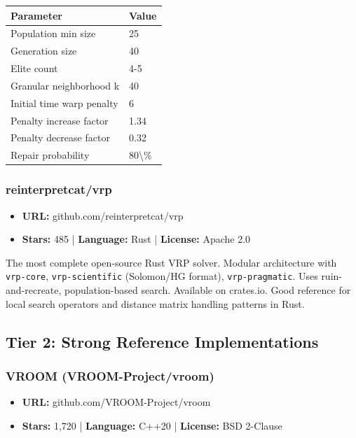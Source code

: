 \documentclass[twocolumn,10pt,letterpaper]{article}
\begin{document}
\vspace{0.4em}
\noindent
\small
\begin{tabularx}{\columnwidth}{@{}XX@{}}
\toprule
\textbf{Parameter} & \textbf{Value} \\
\midrule
Population min size & 25 \\
Generation size & 40 \\
Elite count & 4-5 \\
Granular neighborhood k & 40 \\
Initial time warp penalty & 6 \\
Penalty increase factor & 1.34 \\
Penalty decrease factor & 0.32 \\
Repair probability & 80\textbackslash{}\% \\
\bottomrule
\end{tabularx}
\vspace{0.4em}

\subsubsection{reinterpretcat/vrp}

\begin{itemize}
\setlength{\itemsep}{0pt}
\setlength{\parskip}{0pt}
  \item \textbf{URL:} github.com/reinterpretcat/vrp
  \item \textbf{Stars:} 485 | \textbf{Language:} Rust | \textbf{License:} Apache 2.0
\end{itemize}

The most complete open-source Rust VRP solver. Modular architecture with \texttt{vrp-\allowbreak core}, \texttt{vrp-\allowbreak scientific} (Solomon/HG format), \texttt{vrp-\allowbreak pragmatic}. Uses ruin-and-recreate, population-based search. Available on crates.io. Good reference for local search operators and distance matrix handling patterns in Rust.


\subsection{Tier 2: Strong Reference Implementations}

\subsubsection{VROOM (VROOM-Project/vroom)}

\begin{itemize}
\setlength{\itemsep}{0pt}
\setlength{\parskip}{0pt}
  \item \textbf{URL:} github.com/VROOM-Project/vroom
  \item \textbf{Stars:} 1,720 | \textbf{Language:} C++20 | \textbf{License:} BSD 2-Clause
\end{itemize}
\end{document}
